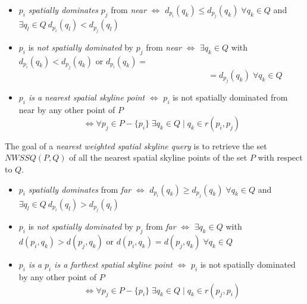 \documentclass[11pt,onecolumn]{elsart3p}
\begin{document}
        \vspace{0.6em}
        \begin{itemize}
            \item $p_i$ {\it spatially dominates} $p_j$ from {\it near }  $\iff$ $d_{p_i}(q_k) \le d_{p_j}(q_k) \; \forall q_k\in Q$ and $\exists q_l\in Q \ d_{p_i}(q_l) < d_{p_j}(q_l)$ \vspace{0.6em}%
            \item $p_i$ is {\it not spatially dominated} by $p_j$ from  {\it near}    $\iff$ $\exists q_k\in Q$ with $d_{p_i}(q_k) < d_{p_j}(q_k)$ {or $d_{p_i}(q_k) = $ $$\hspace{20em}=d_{p_j}(q_k) \; \forall q_k \in Q$$}\vspace{0.6em}
            \item {\it $p_i$ is a } {\it nearest spatial skyline point} $\iff$ $p_i$ is not spatially dominated from near by any other point of $P$
                $$\iff \forall p_j\in P-\{p_i\} \; \exists q_k\in Q  \; | \; q_k \in r(p_i,p_j)$$ %
        \end{itemize}
        The goal of a {\it nearest} {\it weighted spatial skyline query} is to retrieve the set $NWSSQ(P,Q)$ of all the nearest spatial skyline points of the set $P$ with respect to $Q$.\\


        \vspace{0.6em}
        \begin{itemize}
            \item $p_i$ {\it spatially dominates} from {\it far \; } $\iff$ $d_{p_i}(q_k) \ge d_{p_j}(q_k) \; \forall q_k\in Q$ and $\exists q_l\in Q \ d_{p_i}(q_l) > d_{p_j}(q_l)$ \vspace{0.6em}%
            \item $p_i$ is {\it not spatially dominated} by $p_j$ from  {\it far \; } $\iff$ $\exists q_k\in Q$ with $d(p_i, q_k) > d(p_j, q_k)$   {or $d(p_i, q_k) = d(p_j, q_k) \; \forall q_k \in Q$}\vspace{0.6em}
            \item {\it $p_i$ is a } {\it $p_i$ is a farthest spatial skyline point} $\iff$ $p_i$ is not spatially dominated by any other point of $P$
                    $$\iff \forall p_j\in P-\{p_i\} \; \exists q_k\in Q  \; | \; q_k \in r(p_j,p_i)$$ %
        \end{itemize}
\end{document}
